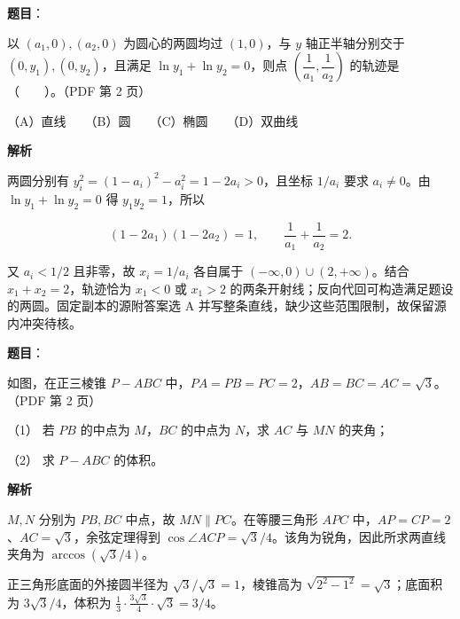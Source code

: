 \begin{answer}

\textbf{题目}：

以 $(a_1,0),(a_2,0)$ 为圆心的两圆均过 $(1,0)$，与 $y$ 轴正半轴分别交于 $(0,y_1),(0,y_2)$，且满足 $\ln y_1+\ln y_2=0$，则点 $\left(\dfrac1{a_1},\dfrac1{a_2}\right)$ 的轨迹是\mbox{（　　）}。（PDF 第 2 页）

（A）直线　　（B）圆　　（C）椭圆　　（D）双曲线

\textbf{解析}

两圆分别有 $y_i^2=(1-a_i)^2-a_i^2=1-2a_i>0$，且坐标 $1/a_i$ 要求 $a_i\ne0$。由 $\ln y_1+\ln y_2=0$ 得 $y_1y_2=1$，所以

\nopagebreak[4]
\[
(1-2a_1)(1-2a_2)=1,\qquad \frac1{a_1}+\frac1{a_2}=2.
\]

又 $a_i<1/2$ 且非零，故 $x_i=1/a_i$ 各自属于 $(-\infty,0)\cup(2,+\infty)$。结合 $x_1+x_2=2$，轨迹恰为 $x_1<0$ 或 $x_1>2$ 的两条开射线；反向代回可构造满足题设的两圆。固定副本的源附答案选 A 并写整条直线，缺少这些范围限制，故保留源内冲突待核。


\end{answer}
\begin{answer}

\textbf{题目}：

如图，在正三棱锥 $P-ABC$ 中，$PA=PB=PC=2$，$AB=BC=AC=\sqrt3$。（PDF 第 2 页）

（1） 若 $PB$ 的中点为 $M$，$BC$ 的中点为 $N$，求 $AC$ 与 $MN$ 的夹角；

（2） 求 $P-ABC$ 的体积。
\nopagebreak[4]
\begin{center}\end{center}
\nopagebreak[4]
\textbf{解析}


$M,N$ 分别为 $PB,BC$ 中点，故 $MN\parallel PC$。在等腰三角形 $APC$ 中，$AP=CP=2$、$AC=\sqrt3$，余弦定理得到 $\cos\angle ACP=\sqrt3/4$。该角为锐角，因此所求两直线夹角为 $\arccos(\sqrt3/4)$。


正三角形底面的外接圆半径为 $\sqrt3/\sqrt3=1$，棱锥高为 $\sqrt{2^2-1^2}=\sqrt3$；底面积为 $3\sqrt3/4$，体积为 $\frac13\cdot\frac{3\sqrt3}{4}\cdot\sqrt3=3/4$。



\end{answer}
